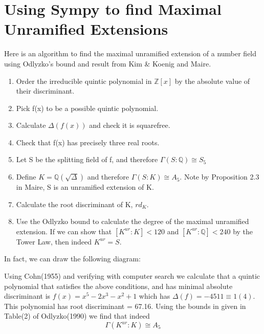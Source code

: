 \documentclass[12pt]{extarticle}
\newcommand{\<}{\langle}
\renewcommand{\>}{\rangle}
\theoremstyle{definition}
\begin{document}
\section{Using Sympy to find Maximal Unramified Extensions}
Here is an algorithm to find the maximal unramified extension of a number field using Odlyzko's bound and result from Kim \& Koenig and Maire.
\begin{enumerate}
  \item  Order the irreducible quintic polynomial in $\mathbb{Z}[x]$ by the absolute value of their discriminant. 
  \item Pick f(x) to be a possible quintic polynomial.
  \item Calculate $\Delta(f(x))$ and check it is squarefree.
  \item Check that f(x) has precisely three real roots. 
  \item Let S be the splitting field of f, and therefore $\Gamma(S:\mathbb{Q})\cong S_5$
  \item Define $K=\mathbb{Q}(\sqrt{\Delta})$ and therefore $\Gamma(S:K)\cong A_5$. Note by Proposition 2.3 in Maire, S is an unramified extension of K. 
  \item Calculate the root discriminant of K, $rd_K$.
  \item Use the Odlyzko bound to calculate the degree of the maximal unramified extension. If we can show that $[K^{ur}:K]<120$ and $[K^{ur}:\mathbb{Q}]<240$ by the Tower Law, then indeed $K^{ur} = S$.
\end{enumerate}
\par
In fact, we can draw the following diagram: 
\par
\begin{center}
\end{center}
Using Cohn(1955) and verifying with computer search we calculate that a quintic polynomial that satisfies the above conditions, and has minimal absolute discriminant is $f(x) = x^5-2x^3-x^2+1$ which has $\Delta(f) = -4511\equiv1(4)$.
This polynomial has root discriminant = 67.16.
Using the bounds in given in Table(2) of Odlyzko(1990) we find that indeed
\begin{equation}
    \Gamma(K^{ur}:K)\cong A_{5}
\end{equation}
\end{document}

